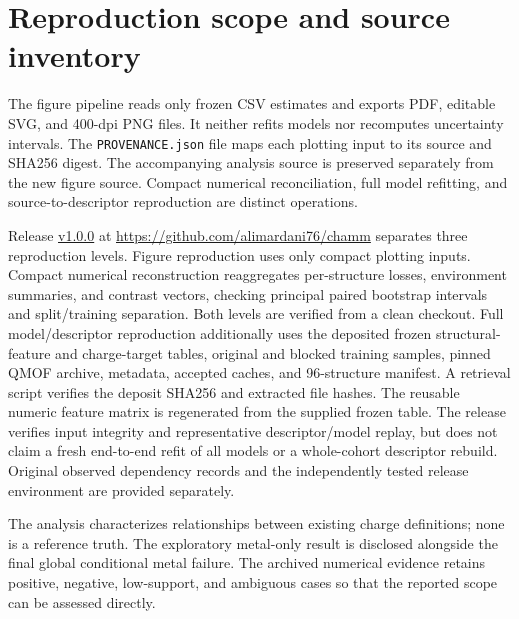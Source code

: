 \documentclass[11pt]{article}
\begin{document}
\section{Reproduction scope and source inventory}
The figure pipeline reads only frozen CSV estimates and exports PDF, editable SVG, and 400-dpi PNG files. It neither refits models nor recomputes uncertainty intervals. The \nolinkurl{PROVENANCE.json} file maps each plotting input to its source and SHA256 digest. The accompanying analysis source is preserved separately from the new figure source. Compact numerical reconciliation, full model refitting, and source-to-descriptor reproduction are distinct operations.

Release \href{https://github.com/alimardani76/chamm/releases/tag/v1.0.0}{v1.0.0} at \url{https://github.com/alimardani76/chamm} separates three reproduction levels. Figure reproduction uses only compact plotting inputs. Compact numerical reconstruction reaggregates per-structure losses, environment summaries, and contrast vectors, checking principal paired bootstrap intervals and split/training separation. Both levels are verified from a clean checkout. Full model/descriptor reproduction additionally uses the deposited frozen structural-feature and charge-target tables, original and blocked training samples, pinned QMOF archive, metadata, accepted caches, and 96-structure manifest. A retrieval script verifies the deposit SHA256 and extracted file hashes. The reusable numeric feature matrix is regenerated from the supplied frozen table. The release verifies input integrity and representative descriptor/model replay, but does not claim a fresh end-to-end refit of all models or a whole-cohort descriptor rebuild. Original observed dependency records and the independently tested release environment are provided separately.

The analysis characterizes relationships between existing charge definitions; none is a reference truth. The exploratory metal-only result is disclosed alongside the final global conditional metal failure. The archived numerical evidence retains positive, negative, low-support, and ambiguous cases so that the reported scope can be assessed directly.
\clearpage

\end{document}
